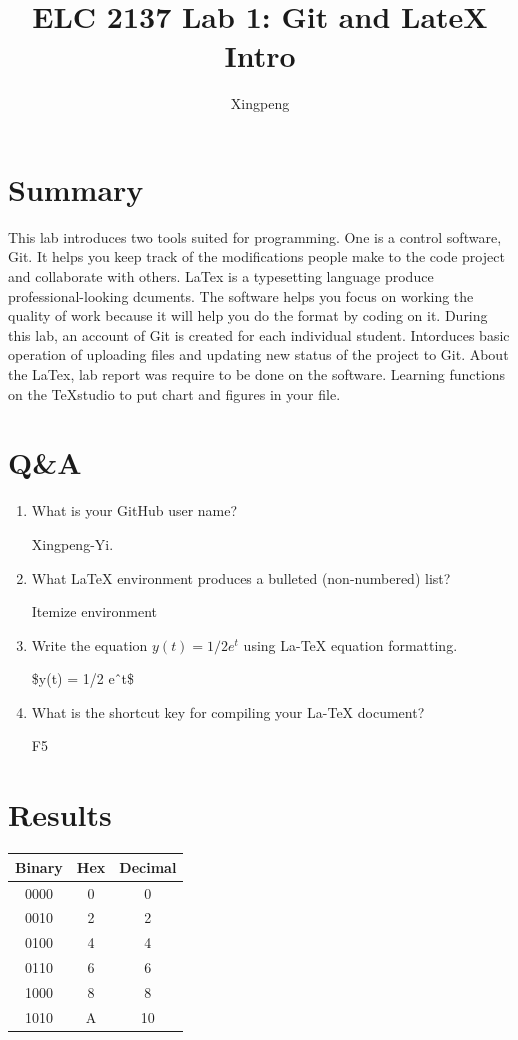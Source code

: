 \documentclass[11pt]{article}
\begin{document}
\title{ELC 2137 Lab 1: Git and LateX Intro}
\author{Xingpeng}

\maketitle


\section*{Summary}

This lab introduces two tools suited for programming. One is a control software, Git. It helps you keep track of the modifications people make to the code project and collaborate with others. LaTex is a typesetting language produce professional-looking dcuments. The software helps you focus on working the quality of work because it will help you do the format by coding on it. During this lab, an account of Git is created for each individual student. Intorduces basic operation of uploading files and updating new status of the project to Git. About the LaTex,  lab report was require to be done on the software. Learning functions on the TeXstudio to put chart and figures in your file. 


\section*{Q\&A}
\begin{enumerate}
\item What is your GitHub user name?

Xingpeng-Yi.

\item What LaTeX environment produces a bulleted (non-numbered) list?

Itemize environment
\item  Write  the  equation $y(t) = 1/2 e^t$ using  La-TeX equation formatting.

\$y(t) = 1/2 e\^\ t\$
\item What is the shortcut key for compiling your La-TeX document?

F5



\end{enumerate}
\section*{Results}


\begin{center}
	\begin{tabular}{c|c|c}
		\toprule
		Binary & Hex & Decimal \\
		\midrule
		0000 & 0 & 0 \\
		0010 & 2 & 2 \\
		0100 & 4 & 4 \\
		0110 & 6 & 6 \\
		1000 & 8 & 8 \\
		1010 & A & 10\\
		\bottomrule
	\end{tabular} 
\end{center}
\end{document}
